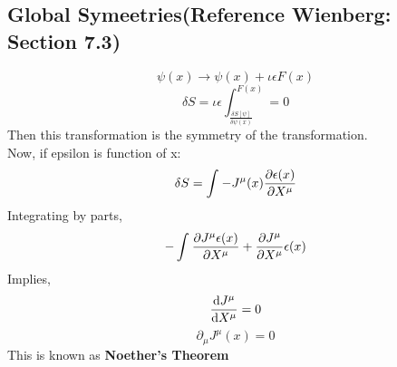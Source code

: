 \documentclass{scrartcl}
\begin{document}
\subsection{Global Symeetries(Reference Wienberg: Section 7.3)}
\[ \psi(x) \rightarrow \psi(x) + \iota \epsilon F(x)\]
\[ \delta S = \iota \epsilon \displaystyle\int_{\displaystyle\frac{\delta S[\psi]}{\delta \psi(x)}}^{F(x)} = 0 \]
Then this transformation is the symmetry of the transformation.\\
Now, if epsilon is function of x:
\[ \delta S = \displaystyle\int_{}^{} -J^\mu(x) \pdv{\epsilon(x)}{X^\mu}  \]
Integrating by parts,
\[ - \displaystyle\int_{}^{} \pdv{J^\mu \epsilon(x)}{X^\mu} + \pdv{J^\mu}{X^\mu} \epsilon(x) \]
Implies,
\[ \dv{J^\mu}{X^\mu} = 0 \]
\[ \partial_\mu J^\mu(x) = 0 \]
This is known as \textbf{Noether's Theorem}
\end{document}
